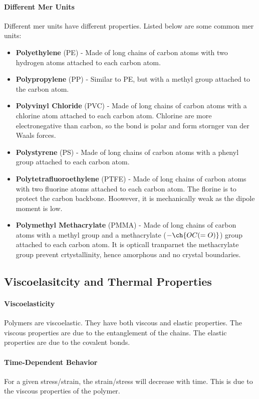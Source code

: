 \documentclass[11pt]{report}
\begin{document}
\paragraph{Different Mer Units} Different mer units have different properties. Listed below are some common mer units:
\begin{itemize}
    \item \textbf{Polyethylene} (PE) - Made of long chains of carbon atoms with two hydrogen atoms attached to each carbon atom.
    \item \textbf{Polypropylene} (PP) - Similar to PE, but with a methyl group attached to the carbon atom.
    \item \textbf{Polyvinyl Chloride} (PVC) - Made of long chains of carbon atoms with a chlorine atom attached to each carbon atom. Chlorine are more electronegative than carbon, so the bond is polar and form stornger van der Waals forces.
    \item \textbf{Polystyrene} (PS) - Made of long chains of carbon atoms with a phenyl group attached to each carbon atom.
    \item \textbf{Polytetrafluoroethylene} (PTFE) - Made of long chains of carbon atoms with two fluorine atoms attached to each carbon atom. The florine is to protect the carbon backbone. Hoowever, it is mechanically weak as the dipole moment is low.
    \item \textbf{Polymethyl Methacrylate} (PMMA) - Made of long chains of carbon atoms with a methyl group and a methacrylate ($-\ch{OC(=O)}$) group attached to each carbon atom. It is opticall tranparnet the methacrylate group prevent crtystallinity, hence amorphous and no crystal boundaries.
\end{itemize}
\subsection{Viscoelasitcity and Thermal Properties}
\paragraph{Viscoelasticity} Polymers are viscoelastic. They have both viscous and elastic properties. The viscous properties are due to the entanglement of the chains. The elastic properties are due to the covalent bonds.
\paragraph{Time-Dependent Behavior} For a given stress/strain, the strain/stress will decrease with time. This is due to the viscous properties of the polymer.
\end{document}
